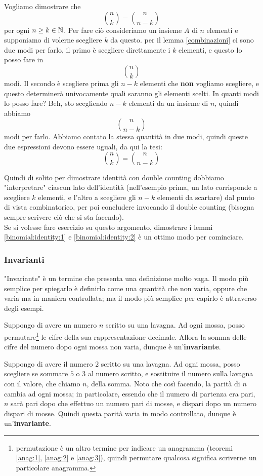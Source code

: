 \documentclass[11pt]{scrartcl}
\begin{document}
	\begin{example}
		Vogliamo dimostrare che $$\binom{n}{k}=\binom{n}{n-k}$$ per ogni $n\ge k \in \mathbb N$. Per fare ciò consideriamo un insieme $A$ di $n$ elementi e supponiamo di volerne scegliere $k$ da questo. per il lemma \ref{combinazioni} ci sono due modi per farlo, il primo è scegliere direttamente i $k$ elementi, e questo lo posso fare in
		$$\binom{n}{k}$$
		modi. Il secondo è scegliere prima gli $n-k$ elementi che \textbf{non} vogliamo scegliere, e questo determinerà univocamente quali saranno gli elementi scelti. In quanti modi lo posso fare? Beh, sto scegliendo $n-k$ elementi da un insieme di $n$, quindi abbiamo
		$$\binom{n}{n-k}$$
		modi per farlo. Abbiamo contato la stessa quantità in due modi, quindi queste due espressioni devono essere uguali, da qui la tesi:
		$$\binom{n}{k}=\binom{n}{n-k}$$
	\end{example}
	Quindi di solito per dimostrare identità con double counting dobbiamo "interpretare" ciascun lato dell'identità (nell'esempio prima, un lato corrisponde a scegliere $k$ elementi, e l'altro a scegliere gli $n-k$ elementi da scartare) dal punto di vista combinatorico, per poi concludere invocando il double counting (bisogna sempre scrivere ciò che si sta facendo). \\
	Se si volesse fare esercizio su questo argomento, dimostrare i lemmi \ref{binomial:identity:1} e \ref{binomial:identity:2} è un ottimo modo per cominciare.
	
	\subsubsection{Invarianti}
	"Invariante" è un termine che presenta una definizione molto vaga. Il modo più semplice per spiegarlo è definirlo come una quantità che non varia, oppure che varia ma in maniera controllata; ma il modo più semplice per capirlo è attraverso degli esempi.
	
	\begin{example}
		Suppongo di avere un numero $n$ scritto su una lavagna. Ad ogni mossa, posso permutare\footnote{permutazione è un altro termine per indicare un anagramma (teoremi \ref{anag:1}, \ref{anag:2} e \ref{anag:3}), quindi permutare qualcosa significa scriverne un particolare anagramma.} le cifre della sua rappresentazione decimale. Allora la somma delle cifre del numero dopo ogni mossa non varia, dunque è un'\textbf{invariante}.
	\end{example}
	\begin{example}
		Suppongo di avere il numero $2$ scritto su una lavagna. Ad ogni mossa, posso scegliere se sommare $5$ o $3$ al numero scritto, e sostituire il numero sulla lavagna con il valore, che chiamo $n$,  della somma. Noto che così facendo, la parità di $n$ cambia ad ogni mossa; in particolare, essendo che il numero di partenza era pari, $n$ sarà pari dopo che effettuo un numero pari di mosse, e dispari dopo un numero dispari di mosse. Quindi questa parità varia in modo controllato, dunque è un'\textbf{invariante}.
	\end{example}
	
\end{document}
